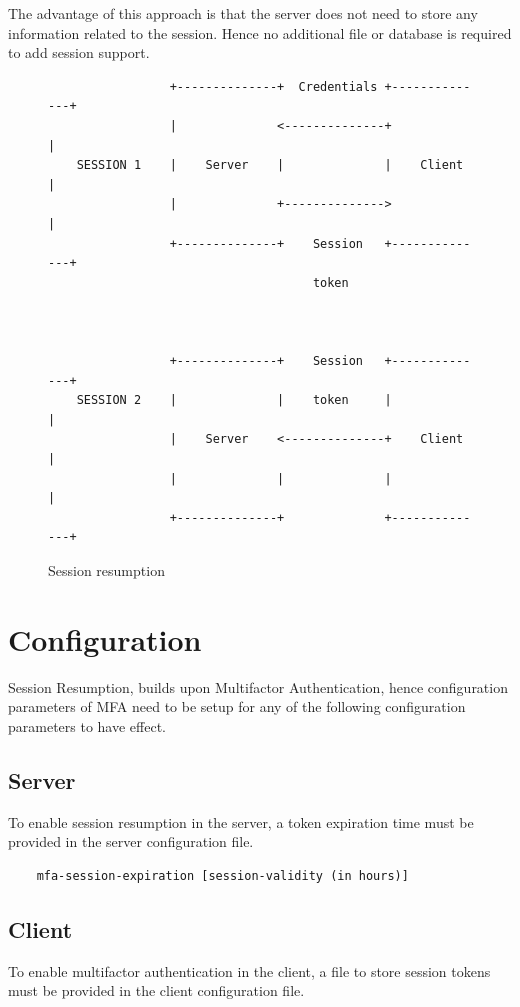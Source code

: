 \documentclass[11pt,oneside]{book}
\begin{document}
The advantage of this approach is that the server does not need to store any information related to
the session. Hence no additional file or database is required to add session support.

\begin{figure}[t]
    \label{session_resumption}
    \centering
    \begin{verbatim}
                 +--------------+  Credentials +--------------+
                 |              <--------------+              |
    SESSION 1    |    Server    |              |    Client    |
                 |              +-------------->              |
                 +--------------+    Session   +--------------+
                                     token



                 +--------------+    Session   +--------------+
    SESSION 2    |              |    token     |              |
                 |    Server    <--------------+    Client    |
                 |              |              |              |
                 +--------------+              +--------------+

    \end{verbatim}
    \vspace{-10mm}
    \caption{Session resumption}
\end{figure}

\section{Configuration}
\label{sess_config}
Session Resumption, builds upon Multifactor Authentication, hence configuration parameters of MFA
need to be setup for any of the following configuration parameters to have effect.

\subsection{Server}
To enable session resumption in the server, a token expiration time must be provided in the server
configuration file.

\begin{verbatim}
    mfa-session-expiration [session-validity (in hours)]
\end{verbatim}

\subsection{Client}
To enable multifactor authentication in the client, a file to store session tokens must be provided
in the client configuration file.
\end{document}
